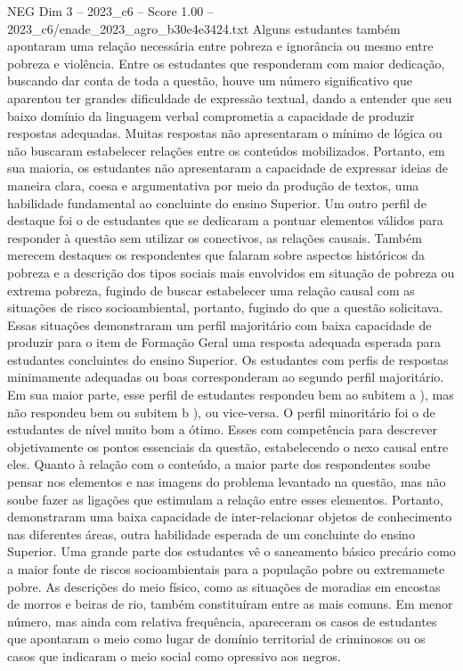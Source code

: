 \begin{textsample}{NEG Dim 3 – 2023\_c6 – Score 1.00 – 2023\_c6/enade\_2023\_agro\_b30e4e3424.txt}
Alguns estudantes também apontaram uma relação necessária entre pobreza e ignorância ou mesmo entre pobreza e violência.
Entre os estudantes que responderam com maior dedicação, buscando dar conta de toda a questão, houve um número significativo que aparentou ter grandes dificuldade de expressão textual, dando a entender que seu baixo domínio da linguagem verbal comprometia a capacidade de produzir respostas adequadas.
Muitas respostas não apresentaram o mínimo de lógica ou não buscaram estabelecer relações entre os conteúdos mobilizados.
Portanto, em sua maioria, os estudantes não apresentaram a capacidade de expressar ideias de maneira clara, coesa e argumentativa por meio da produção de textos, uma habilidade fundamental ao concluinte do ensino Superior.
Um outro perfil de destaque foi o de estudantes que se dedicaram a pontuar elementos válidos para responder à questão sem utilizar os conectivos, as relações causais.
Também merecem destaques os respondentes que falaram sobre aspectos históricos da pobreza e a descrição dos tipos sociais mais envolvidos em situação de pobreza ou extrema pobreza, fugindo de buscar estabelecer uma relação causal com as situações de risco socioambiental, portanto, fugindo do que a questão solicitava.
Essas situações demonstraram um perfil majoritário com baixa capacidade de produzir para o item de Formação Geral uma resposta adequada esperada para estudantes concluintes do ensino Superior.
Os estudantes com perfis de respostas minimamente adequadas ou boas corresponderam ao segundo perfil majoritário.
Em sua maior parte, esse perfil de estudantes respondeu bem ao subitem a ), mas não respondeu bem ou subitem b ), ou vice-versa.
O perfil minoritário foi o de estudantes de nível muito bom a ótimo.
Esses com competência para descrever objetivamente os pontos essenciais da questão, estabelecendo o nexo causal entre eles.
Quanto à relação com o conteúdo, a maior parte dos respondentes soube pensar nos elementos e nas imagens do problema levantado na questão, mas não soube fazer as ligações que estimulam a relação entre esses elementos.
Portanto, demonstraram uma baixa capacidade de inter-relacionar objetos de conhecimento nas diferentes áreas, outra habilidade esperada de um concluinte do ensino Superior.
Uma grande parte dos estudantes vê o saneamento básico precário como a maior fonte de riscos socioambientais para a população pobre ou extremamete pobre.
As descrições do meio físico, como as situações de moradias em encostas de morros e beiras de rio, também constituíram entre as mais comuns.
Em menor número, mas ainda com relativa frequência, apareceram os casos de estudantes que apontaram o meio como lugar de domínio territorial de criminosos ou os casos que indicaram o meio social como opressivo aos negros.

\end{textsample}
